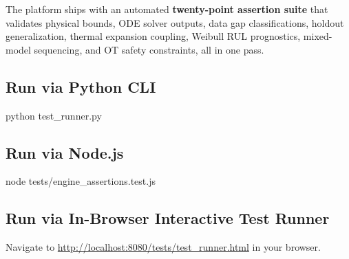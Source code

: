 \documentclass[11pt]{article}
\begin{document}
The platform ships with an automated \textbf{twenty-point assertion suite} that validates physical bounds, ODE solver outputs, data gap classifications, holdout generalization, thermal expansion coupling, Weibull RUL prognostics, mixed-model sequencing, and OT safety constraints, all in one pass.

\subsection{Run via Python CLI}
\begin{tcolorbox}[colback=lightbg,colframe=sylasgray,arc=1mm,fontupper=\ttfamily\small]
python test\_runner.py
\end{tcolorbox}

\subsection{Run via Node.js}
\begin{tcolorbox}[colback=lightbg,colframe=sylasgray,arc=1mm,fontupper=\ttfamily\small]
node tests/engine\_assertions.test.js
\end{tcolorbox}

\subsection{Run via In-Browser Interactive Test Runner}
Navigate to \url{http://localhost:8080/tests/test_runner.html} in your browser.
\end{document}
